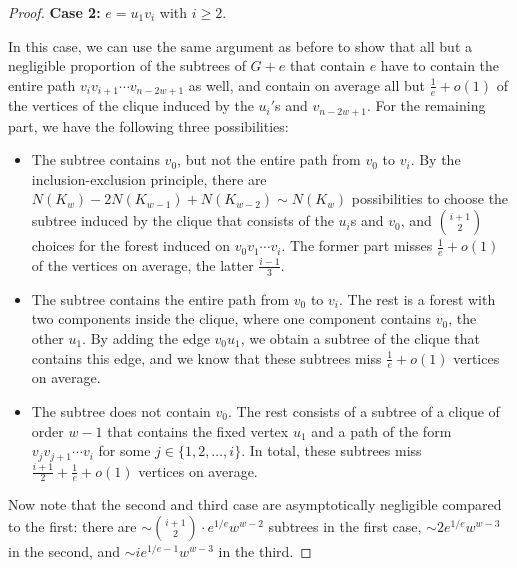 \documentclass[11pt]{article}
\theoremstyle{definition}
\newtheorem{claim}[thr]{Claim}
\begin{document}
\begin{proof}
 \textbf{Case 2:} $e=u_1 v_i$ with $i\ge 2.$ 

In this case, we can use the same argument as before to show that all but a negligible proportion of the subtrees of $G+e$ that contain $e$ have to contain the entire path $v_i v_{i+1} \cdots v_{n-2w+1}$ as well, and contain on average all but $\frac1e + o(1)$ of the vertices of the clique induced by the $u_i'$s and $v_{n-2w+1}$. For the remaining part, we have the following three possibilities:
\begin{itemize}
\item The subtree contains $v_0$, but not the entire path from $v_0$ to $v_i$. By the inclusion-exclusion principle, there are $N(K_w) - 2N(K_{w-1}) + N(K_{w-2}) \sim N(K_w)$ possibilities to choose the subtree induced by the clique that consists of the $u_i$s and $v_0$, and $\binom{i+1}{2}$ choices for the forest induced on $v_0v_1 \cdots v_i$. The former part misses $\frac1e + o(1)$ of the vertices on average, the latter $\frac{i-1}{3}$.
\item The subtree contains the entire path from $v_0$ to $v_i$. The rest is a forest with two components inside the clique, where one component contains $v_0$, the other $u_1$. By adding the edge $v_0u_1$, we obtain a subtree of the clique that contains this edge, and we know that these subtrees miss $\frac{1}{e} + o(1)$ vertices on average.
\item The subtree does not contain $v_0$. The rest consists of a subtree of a clique of order $w-1$ that contains the fixed vertex $u_1$ and a path of the form $v_jv_{j+1} \cdots v_i$ for some $j \in \{1,2,\ldots,i\}$. In total, these subtrees miss $\frac{i+1}{2} + \frac1e + o(1)$ vertices on average.
\end{itemize}
Now note that the second and third case are asymptotically negligible compared to the first: there are $\sim \binom{i+1}{2} \cdot e^{1/e} w^{w-2}$ subtrees in the first case, $\sim 2e^{1/e} w^{w-3}$ in the second, and $\sim i e^{1/e-1} w^{w-3}$ in the third. 





\end{proof}
\end{document}
